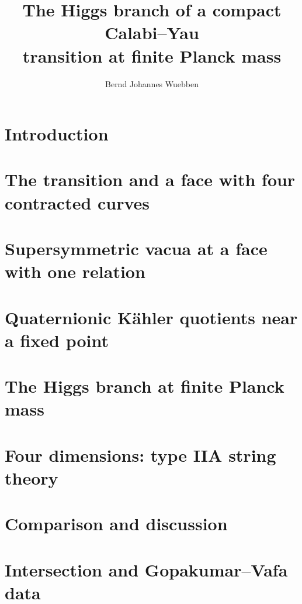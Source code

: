 \documentclass[11pt,letterpaper]{article}
\title{The Higgs branch of a compact Calabi--Yau\\transition at finite Planck mass}
\author{Bernd Johannes Wuebben}
\affiliation{New York, NY, USA}
\date{}
\theoremstyle{definition}
\theoremstyle{remark}
\begin{document}
\hypersetup{pageanchor=false}
\maketitle
\hypersetup{pageanchor=true}

\section{Introduction}
\label{sec:introduction}


\section{The transition and a face with four contracted curves}
\label{sec:face}


\section{Supersymmetric vacua at a face with one relation}
\label{sec:vacua}


\section{Quaternionic K\"ahler quotients near a fixed point}
\label{sec:quotients}


\section{The Higgs branch at finite Planck mass}
\label{sec:higgs}


\section{Four dimensions: type IIA string theory}
\label{sec:4d}


\section{Comparison and discussion}
\label{sec:discussion}


\appendix
\section{Intersection and Gopakumar--Vafa data}
\label{app:data}




\end{document}
